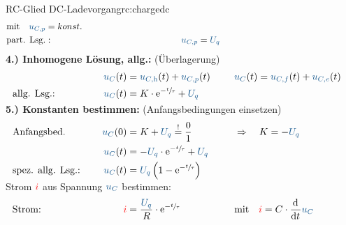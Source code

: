 {\begin{bsp}{RC-Glied DC-Ladevorgang}{rc:chargedc}
\begin{align*}
                    &\text{mit}\quad \ecv{u_{C,p}} = konst.  \\
            &\text{part. Lsg.}:&&&
                \ecv{u_{C,p}} &= \ecv{U_q}
                \\[-15pt]&\hphantom{R1ooooooo}&&&\hphantom{L3oooooooooooooooooooo}&\hphantom{R3ooo}&&&&\hphantom{R5oooooooooooooooooooooo}\nonumber%
            \end{align*}%
        \textbf{4.) Inhomogene Lösung, allg.:} (Überlagerung)%
        \begin{align*}%
            &&&&
                \ecv{u_C}(t) &= \ecv{u_{C,\mathrm{h}}}(t) + \ecv{u_{C,p}}(t) &&&
                &\ecv{u_C}(t)= \ecv{u_{C,f}}(t) + \ecv{u_{C,e}}(t)  \\
            &\text{allg. Lsg.:}&&&
                \ecv{u_C}(t) &= K \cdot \mathrm{e}^{-\sfrac{t}{\tau}} + \ecv{U_q}
            \\[-15pt]&\hphantom{R1oooooooooooo}&&&\hphantom{L3ooo}&\hphantom{R3oooooooooooooooo}&&&&\hphantom{R5oooooooooooooooooooooo}\nonumber%
        \end{align*}%
        \textbf{5.) Konstanten bestimmen:} (Anfangsbedingungen einsetzen)%
        \begin{align*}%
            &\text{Anfangsbed.}&&&
                \ecv{u_C}(0) &= K + \ecv{U_q} \overset{!}{=} \frac{0}{1} &&&
                &\Rightarrow\quad K = -\ecv{U_q} \\
            &&&&
                \ecv{u_C}(t) &= -\ecv{U_q} \cdot \mathrm{e}^{-\sfrac{t}{\tau}} + \ecv{U_q} \\
            &\text{spez. allg. Lsg.:}&&&
                \ecv{u_C}(t) &= \ecv{U_q} \left( 1 - \mathrm{e}^{-\sfrac{t}{\tau}} \right)
            \\[-15pt]&\hphantom{R1oooooooooooo}&&&\hphantom{L3ooo}&\hphantom{R3oooooooooooooooo}&&&&\hphantom{R5oooooooooooooooooooooo}\nonumber%
            \end{align*}%
        Strom ${\color{red}i}$ aus Spannung $\ecv{u_C}$ bestimmen:%
        \begin{align*}%
            &\text{Strom:}&&&
                \eci{i} &= \frac{\ecv{U_q}}{R} \cdot \mathrm{e}^{-\sfrac{t}{\tau}} &&&
                &\text{mit}\quad \eci{i} = C \cdot \dt \ecv{u_C}
            \\[-15pt]&\hphantom{R1oooooooooooo}&&&\hphantom{L3ooo}&\hphantom{R3oooooooooooooooo}&&&&\hphantom{R5oooooooooooooooooooooo}\nonumber%
        \end{align*}
        \endgroup
    \end{bsp}
}%

